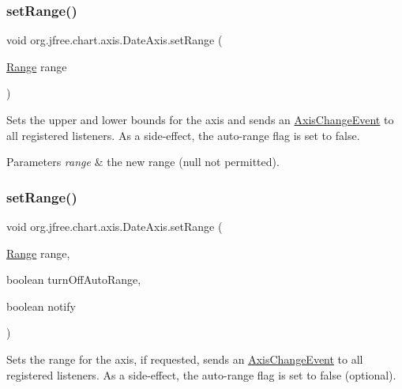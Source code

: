 \subsubsection{\texorpdfstring{set\+Range()}{setRange()}\hspace{0.1cm}{\footnotesize\ttfamily [1/4]}}
{\footnotesize\ttfamily void org.\+jfree.\+chart.\+axis.\+Date\+Axis.\+set\+Range (\begin{DoxyParamCaption}\item[{\mbox{\hyperlink{classorg_1_1jfree_1_1data_1_1_range}{Range}}}]{range }\end{DoxyParamCaption})}

Sets the upper and lower bounds for the axis and sends an \mbox{\hyperlink{}{Axis\+Change\+Event}} to all registered listeners. As a side-\/effect, the auto-\/range flag is set to false.


\begin{DoxyParams}{Parameters}
{\em range} & the new range ({\ttfamily null} not permitted). \\
\hline
\end{DoxyParams}
\mbox{\label{classorg_1_1jfree_1_1chart_1_1axis_1_1_date_axis_a7b9cc10a269563c2a450213c6420b8cc}} 
\subsubsection{\texorpdfstring{set\+Range()}{setRange()}\hspace{0.1cm}{\footnotesize\ttfamily [2/4]}}
{\footnotesize\ttfamily void org.\+jfree.\+chart.\+axis.\+Date\+Axis.\+set\+Range (\begin{DoxyParamCaption}\item[{\mbox{\hyperlink{classorg_1_1jfree_1_1data_1_1_range}{Range}}}]{range,  }\item[{boolean}]{turn\+Off\+Auto\+Range,  }\item[{boolean}]{notify }\end{DoxyParamCaption})}

Sets the range for the axis, if requested, sends an \mbox{\hyperlink{}{Axis\+Change\+Event}} to all registered listeners. As a side-\/effect, the auto-\/range flag is set to {\ttfamily false} (optional).


